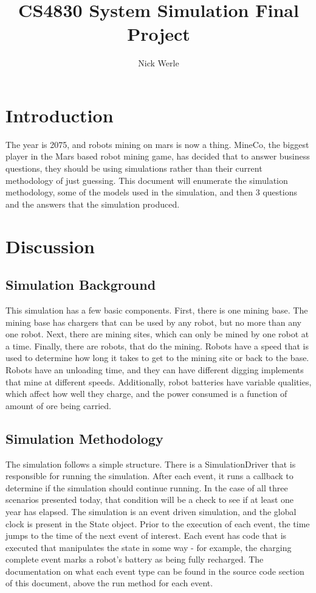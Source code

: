 \documentclass{article}
\title{CS4830 System Simulation Final Project}
\author{Nick Werle}
\begin{document}
\maketitle
\newpage
\tableofcontents
\newpage
\section{Introduction}
The year is 2075, and robots mining on mars is now a thing.
MineCo, the biggest player in the Mars based robot mining game, has decided that to answer business questions, they should be using simulations rather than their current methodology of just guessing.
This document will enumerate the simulation methodology, some of the models used in the simulation, and then 3 questions and the answers that the simulation produced.

\section{Discussion}
\subsection{Simulation Background}
This simulation has a few basic components.
First, there is one mining base.
The mining base has chargers that can be used by any robot, but no more than any one robot.
Next, there are mining sites, which can only be mined by one robot at a time.
Finally, there are robots, that do the mining.
Robots have a speed that is used to determine how long it takes to get to the mining site or back to the base.
Robots have an unloading time, and they can have different digging implements that mine at different speeds.
Additionally, robot batteries have variable qualities, which affect how well they charge, and the power consumed is a function of amount of ore being carried.

\subsection{Simulation Methodology}
The simulation follows a simple structure.
There is a SimulationDriver that is responsible for running the simulation.
After each event, it runs a callback to determine if the simulation should continue running.
In the case of all three scenarios presented today, that condition will be a check to see if at least one year has elapsed.
The simulation is an event driven simulation, and the global clock is present in the State object.
Prior to the execution of each event, the time jumps to the time of the next event of interest.
Each event has code that is executed that manipulates the state in some way - for example, the charging complete event marks a robot's battery as being fully recharged.
The documentation on what each event type can be found in the source code section of this document, above the run method for each event.
\end{document}
